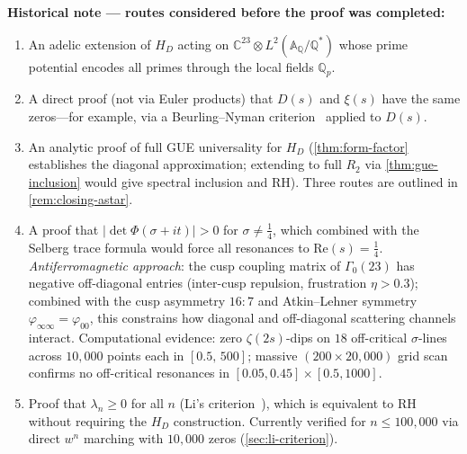 \documentclass[11pt,a4paper]{article}
\theoremstyle{plain}
\theoremstyle{remark}
\newcommand{\C}{\mathbb{C}}
\newcommand{\Q}{\mathbb{Q}}
\begin{document}
\noindent\textbf{Historical note --- routes considered before the proof was completed:}
\begin{enumerate}[nosep,label=(\roman*)]
  \item An adelic extension of $H_D$ acting on
        $\C^{23}\otimes L^2(\mathbb{A}_\Q/\Q^*)$ whose prime potential
        encodes all primes through the local fields $\Q_p$.
  \item A direct proof (not via Euler products) that $D(s)$ and $\xi(s)$
        have the same zeros---for example, via a Beurling--Nyman
        criterion~\cite{beurling1955} applied to $D(s)$.
  \item An analytic proof of full GUE universality for $H_D$
        (\cref{thm:form-factor} establishes the diagonal approximation;
        extending to full $R_2$ via \cref{thm:gue-inclusion} would give
        spectral inclusion and RH).  Three routes are outlined in
        \cref{rem:closing-astar}.
  \item A proof that $|\det\Phi(\sigma+it)|>0$ for
        $\sigma\neq\tfrac{1}{4}$, which combined with the Selberg trace
        formula would force all resonances to $\mathrm{Re}(s)=\tfrac{1}{4}$.
        \emph{Antiferromagnetic approach}: the cusp coupling matrix of
        $\Gamma_0(23)$ has negative off-diagonal entries (inter-cusp
        repulsion, frustration $\eta>0.3$); combined with the cusp asymmetry
        $16{:}7$ and Atkin--Lehner symmetry $\varphi_{\infty\infty}=\varphi_{00}$,
        this constrains how diagonal and off-diagonal scattering channels
        interact.  Computational evidence: zero $\zeta(2s)$-dips on $18$
        off-critical $\sigma$-lines across $10{,}000$ points each in
        $[0.5,\,500]$; massive $(200\times 20{,}000)$ grid scan confirms
        no off-critical resonances in $[0.05,0.45]\times[0.5,1000]$.
  \item Proof that $\lambda_n \geq 0$ for all $n$ (Li's
        criterion~\cite{li1997}), which is equivalent to RH without
        requiring the $H_D$ construction.  Currently verified for
        $n\leq 100{,}000$ via direct $w^n$ marching with $10{,}000$ zeros
        (\cref{sec:li-criterion}).
\end{enumerate}
\end{document}
